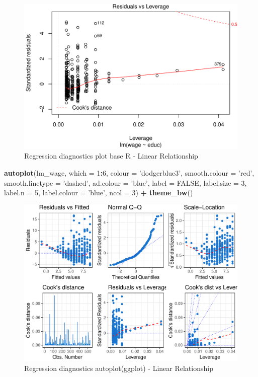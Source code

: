 \documentclass[]{book}
\newenvironment{Shaded}{\begin{snugshade}}{\end{snugshade}}
\newcommand{\DataTypeTok}[1]{\textcolor[rgb]{0.13,0.29,0.53}{#1}}
\newcommand{\DecValTok}[1]{\textcolor[rgb]{0.00,0.00,0.81}{#1}}
\newcommand{\KeywordTok}[1]{\textcolor[rgb]{0.13,0.29,0.53}{\textbf{#1}}}
\newcommand{\NormalTok}[1]{#1}
\newcommand{\OperatorTok}[1]{\textcolor[rgb]{0.81,0.36,0.00}{\textbf{#1}}}
\newcommand{\OtherTok}[1]{\textcolor[rgb]{0.56,0.35,0.01}{#1}}
\newcommand{\StringTok}[1]{\textcolor[rgb]{0.31,0.60,0.02}{#1}}
\begin{document}
\begin{figure}

{\centering \includegraphics[width=0.8\linewidth]{MEM5220_R_files/figure-latex/fig12-4} 

}

\caption{Regression diagnostics plot base R - Linear Relationship}\label{fig:fig124}
\end{figure}

\begin{Shaded}
\begin{Highlighting}[]
\KeywordTok{autoplot}\NormalTok{(lm_wage, }\DataTypeTok{which =} \DecValTok{1}\OperatorTok{:}\DecValTok{6}\NormalTok{, }\DataTypeTok{colour =} \StringTok{'dodgerblue3'}\NormalTok{,}
         \DataTypeTok{smooth.colour =} \StringTok{'red'}\NormalTok{, }\DataTypeTok{smooth.linetype =} \StringTok{'dashed'}\NormalTok{,}
         \DataTypeTok{ad.colour =} \StringTok{'blue'}\NormalTok{,}
         \DataTypeTok{label =} \OtherTok{FALSE}\NormalTok{,}
         \DataTypeTok{label.size =} \DecValTok{3}\NormalTok{, }\DataTypeTok{label.n =} \DecValTok{5}\NormalTok{, }\DataTypeTok{label.colour =} \StringTok{'blue'}\NormalTok{,}
         \DataTypeTok{ncol =} \DecValTok{3}\NormalTok{) }\OperatorTok{+}
\StringTok{  }\KeywordTok{theme_bw}\NormalTok{()}
\end{Highlighting}
\end{Shaded}

\begin{figure}

{\centering \includegraphics[width=0.8\linewidth]{MEM5220_R_files/figure-latex/fig13-1} 

}

\caption{Regression diagnostics autoplot(ggplot) - Linear Relationship}\label{fig:fig13}
\end{figure}
\end{document}
